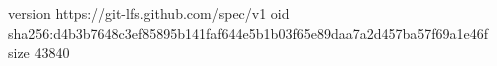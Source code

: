 version https://git-lfs.github.com/spec/v1
oid sha256:d4b3b7648c3ef85895b141faf644e5b1b03f65e89daa7a2d457ba57f69a1e46f
size 43840
